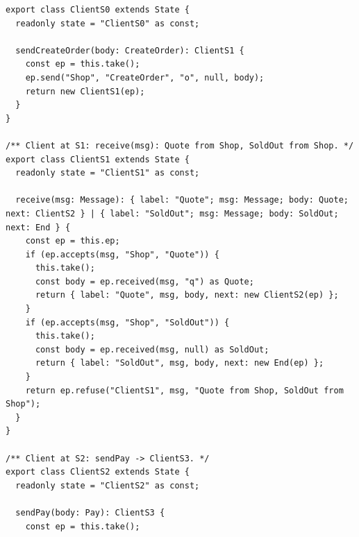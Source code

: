 \begin{lstlisting}[language={},basicstyle=\ttfamily\footnotesize,breaklines=true]
export class ClientS0 extends State {
  readonly state = "ClientS0" as const;

  sendCreateOrder(body: CreateOrder): ClientS1 {
    const ep = this.take();
    ep.send("Shop", "CreateOrder", "o", null, body);
    return new ClientS1(ep);
  }
}

/** Client at S1: receive(msg): Quote from Shop, SoldOut from Shop. */
export class ClientS1 extends State {
  readonly state = "ClientS1" as const;

  receive(msg: Message): { label: "Quote"; msg: Message; body: Quote; next: ClientS2 } | { label: "SoldOut"; msg: Message; body: SoldOut; next: End } {
    const ep = this.ep;
    if (ep.accepts(msg, "Shop", "Quote")) {
      this.take();
      const body = ep.received(msg, "q") as Quote;
      return { label: "Quote", msg, body, next: new ClientS2(ep) };
    }
    if (ep.accepts(msg, "Shop", "SoldOut")) {
      this.take();
      const body = ep.received(msg, null) as SoldOut;
      return { label: "SoldOut", msg, body, next: new End(ep) };
    }
    return ep.refuse("ClientS1", msg, "Quote from Shop, SoldOut from Shop");
  }
}

/** Client at S2: sendPay -> ClientS3. */
export class ClientS2 extends State {
  readonly state = "ClientS2" as const;

  sendPay(body: Pay): ClientS3 {
    const ep = this.take();
\end{lstlisting}
